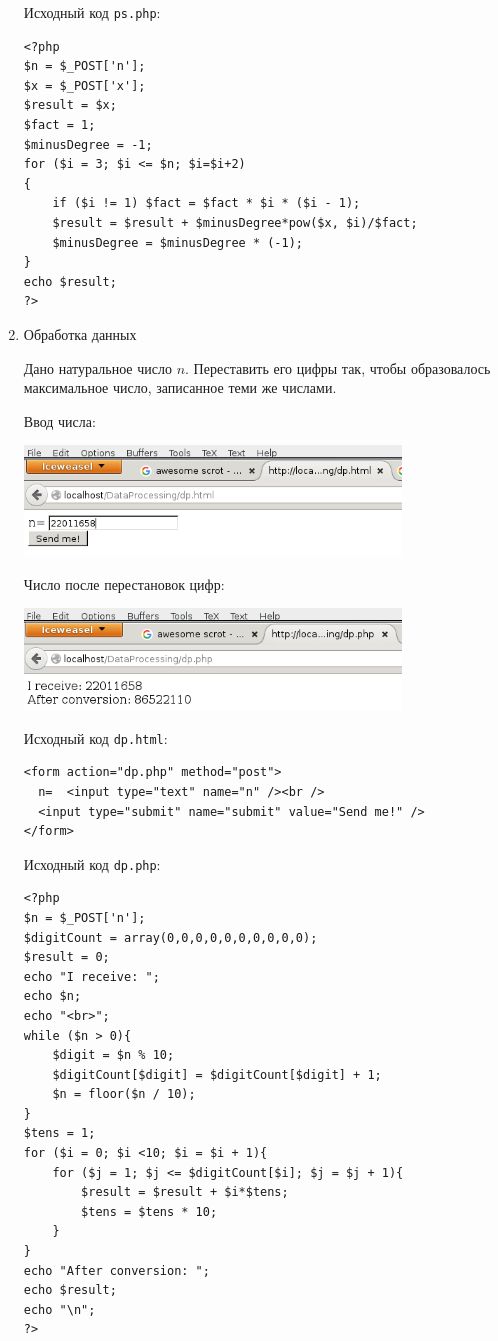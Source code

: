 \begin{enumerate}
Исходный код \verb|ps.php|:

\begin{verbatim}
<?php
$n = $_POST['n'];
$x = $_POST['x'];
$result = $x;
$fact = 1;
$minusDegree = -1;
for ($i = 3; $i <= $n; $i=$i+2)
{
    if ($i != 1) $fact = $fact * $i * ($i - 1);
    $result = $result + $minusDegree*pow($x, $i)/$fact;
    $minusDegree = $minusDegree * (-1);
}
echo $result;
?>
\end{verbatim}

\item{Обработка данных}

  Дано натуральное число $n$. Переставить его цифры так, чтобы образовалось максимальное число, записанное теми же числами.

  Ввод числа:

  \begin{center} 
    \includegraphics[width=10cm]{img/07.png}
  \end{center}

  Число после перестановок цифр:

    \begin{center} 
    \includegraphics[width=10cm]{img/08.png}
  \end{center}

    Исходный код \verb|dp.html|:
\begin{verbatim}
<form action="dp.php" method="post">
  n=  <input type="text" name="n" /><br />
  <input type="submit" name="submit" value="Send me!" />
</form>
\end{verbatim}

Исходный код \verb|dp.php|:
\begin{verbatim}
<?php
$n = $_POST['n'];
$digitCount = array(0,0,0,0,0,0,0,0,0,0);
$result = 0;
echo "I receive: ";
echo $n;
echo "<br>";
while ($n > 0){
    $digit = $n % 10;
    $digitCount[$digit] = $digitCount[$digit] + 1;
    $n = floor($n / 10);
}
$tens = 1;
for ($i = 0; $i <10; $i = $i + 1){
    for ($j = 1; $j <= $digitCount[$i]; $j = $j + 1){
        $result = $result + $i*$tens;
        $tens = $tens * 10;
    }
}
echo "After conversion: ";
echo $result;
echo "\n";
?>
\end{verbatim}
\end{enumerate}

